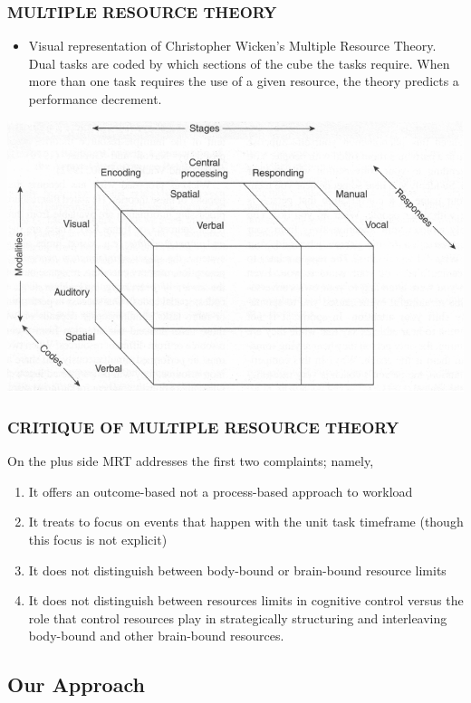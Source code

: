 \documentclass{beamer}
\begin{document}
\begin{frame}
	\frametitle{MULTIPLE RESOURCE THEORY}
	\begin{itemize}
		\item Visual representation of Christopher Wicken's Multiple Resource Theory. Dual tasks are coded by which sections of the cube the tasks require. When more than one task requires the use of a given resource, the theory predicts a performance decrement.
	\end{itemize}
	\begin{center}
		\includegraphics[width=.75\textwidth]{../zNvBkFigs/wickens-mrt}
	\end{center}
\end{frame}

\begin{frame}
	\frametitle{CRITIQUE OF MULTIPLE RESOURCE THEORY}
On the plus side MRT addresses the first two complaints; namely,
	\begin{enumerate}
		\item It offers an outcome-based not a process-based approach to workload
		\item It treats to focus on events that happen with the unit task timeframe (though this focus is not explicit)
	\pause
		\item It does not distinguish between body-bound or brain-bound resource limits
		\item It does not distinguish between resources limits in cognitive control versus the role that control resources play in strategically structuring and interleaving body-bound and other brain-bound resources.
	\end{enumerate}
\end{frame}

\subsection{Our Approach}
\end{document}
